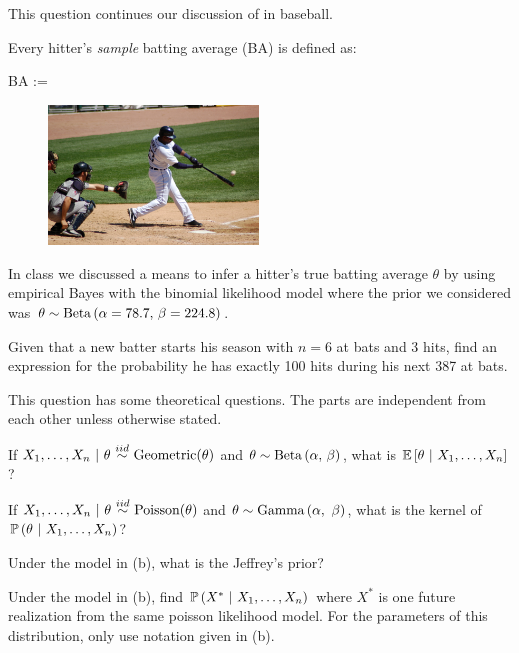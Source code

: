 \documentclass[12pt]{article}
\begin{document}
\eenum

\problem This question continues our discussion of  in baseball.


\noindent Every hitter's \emph{sample} batting average (BA) is defined as:

\beqn
BA := 
\eeqn

\begin{figure}[htp]
\centering
\includegraphics[width=2.2in]{baseball.jpg}
\end{figure}
\noindent In class we discussed a means to infer a hitter's true batting average $\theta$ by using empirical Bayes with the binomial likelihood model where the prior we considered was $\theta \sim \mathrm{Beta}\left(\alpha = 78.7,\,\beta = 224.8\right)$.



\benum

 Given that a new batter starts his season with $n=6$ at bats and 3 hits, find an expression for the probability he has exactly 100 hits during his next 387 at bats. 

\eenum

\problem This question has some theoretical questions. The parts are independent from each other unless otherwise stated.

\benum

 If $\Xoneton~|~\theta \iid \text{Geometric}(\theta)$ and $\theta \sim \mathrm{Beta}\left(\alpha,\,\beta\right)$, what is $\mathbb{E}\left[\theta~|~X_1, \ldots, X_n\right]$? 

 If $\Xoneton~|~\theta \iid \text{Poisson}(\theta)$ and $\theta \sim \text{Gamma}\left(\alpha, ~\beta\right)$, what is the kernel of $\mathbb{P}\left(\theta~|~X_1, \ldots, X_n\right)$? 

 Under the model in (b), what is the Jeffrey's prior? 

 Under the model in (b), find $\mathbb{P}\left(X^*~|~X_1, \ldots, X_n\right)$ where $X^*$ is one future realization from the same poisson likelihood model. For the parameters of this distribution, only use notation given in (b). 
\end{document}
